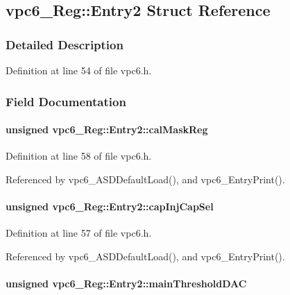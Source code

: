 \subsection{vpc6\_\-Reg::Entry2 Struct Reference}
\label{structvpc6__Reg_1_1Entry2}


\subsubsection{Detailed Description}


Definition at line 54 of file vpc6.h.

\subsubsection{Field Documentation}
\paragraph[{calMaskReg}]{\setlength{\rightskip}{0pt plus 5cm}unsigned {\bf vpc6\_\-Reg::Entry2::calMaskReg}}\hfill\label{structvpc6__Reg_1_1Entry2_a9bfd5176f1e3eb6c89d073738b36d4ad}


Definition at line 58 of file vpc6.h.

Referenced by vpc6\_\-ASDDefaultLoad(), and vpc6\_\-EntryPrint().
\paragraph[{capInjCapSel}]{\setlength{\rightskip}{0pt plus 5cm}unsigned {\bf vpc6\_\-Reg::Entry2::capInjCapSel}}\hfill\label{structvpc6__Reg_1_1Entry2_a7462fba33f8baddb8cae89890e791fb8}


Definition at line 57 of file vpc6.h.

Referenced by vpc6\_\-ASDDefaultLoad(), and vpc6\_\-EntryPrint().
\paragraph[{mainThresholdDAC}]{\setlength{\rightskip}{0pt plus 5cm}unsigned {\bf vpc6\_\-Reg::Entry2::mainThresholdDAC}}\hfill\label{structvpc6__Reg_1_1Entry2_abcdc7a2785defbea9a80bfcad883e4a6}



